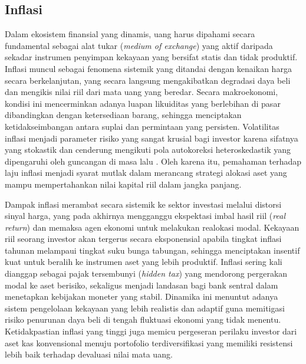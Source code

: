 \subsection{Inflasi}
Dalam ekosistem finansial yang dinamis, uang harus dipahami secara fundamental sebagai alat tukar (\textit{medium of exchange}) yang aktif daripada sekadar instrumen penyimpan kekayaan yang bersifat statis dan tidak produktif. Inflasi muncul sebagai fenomena sistemik yang ditandai dengan kenaikan harga secara berkelanjutan, yang secara langsung mengakibatkan degradasi daya beli dan mengikis nilai riil dari mata uang yang beredar. Secara makroekonomi, kondisi ini mencerminkan adanya luapan likuiditas yang berlebihan di pasar dibandingkan dengan ketersediaan barang, sehingga menciptakan ketidakseimbangan antara suplai dan permintaan yang persisten. Volatilitas inflasi menjadi parameter risiko yang sangat krusial bagi investor karena sifatnya yang stokastik dan cenderung mengikuti pola autokoreksi heteroskedastik yang dipengaruhi oleh guncangan di masa lalu \cite{engle_1982}. Oleh karena itu, pemahaman terhadap laju inflasi menjadi syarat mutlak dalam merancang strategi alokasi aset yang mampu mempertahankan nilai kapital riil dalam jangka panjang.

Dampak inflasi merambat secara sistemik ke sektor investasi melalui distorsi sinyal harga, yang pada akhirnya mengganggu ekspektasi imbal hasil riil (\textit{real return}) dan memaksa agen ekonomi untuk melakukan realokasi modal. Kekayaan riil seorang investor akan tergerus secara eksponensial apabila tingkat inflasi tahunan melampaui tingkat suku bunga tabungan, sehingga menciptakan insentif kuat untuk beralih ke instrumen aset yang lebih produktif. Inflasi sering kali dianggap sebagai pajak tersembunyi (\textit{hidden tax}) yang mendorong pergerakan modal ke aset berisiko, sekaligus menjadi landasan bagi bank sentral dalam menetapkan kebijakan moneter yang stabil. Dinamika ini menuntut adanya sistem pengelolaan kekayaan yang lebih realistis dan adaptif guna memitigasi risiko penurunan daya beli di tengah fluktuasi ekonomi yang tidak menentu. Ketidakpastian inflasi yang tinggi juga memicu pergeseran perilaku investor dari aset kas konvensional menuju portofolio terdiversifikasi yang memiliki resistensi lebih baik terhadap devaluasi nilai mata uang.

